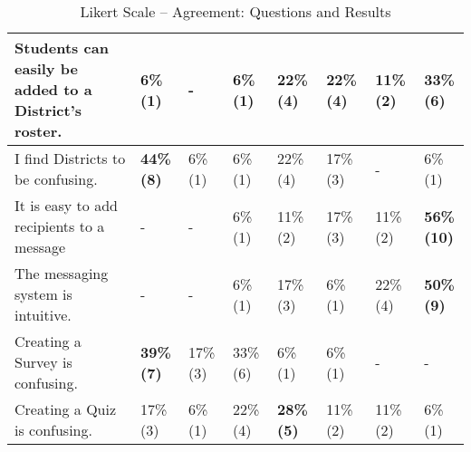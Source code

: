 \begin{table}[h!]
{\begin{tabular}{| C{8cm} |p{0.7cm}|p{0.7cm}|p{0.7cm}|p{0.7cm}|p{0.7cm}|p{0.7cm}|p{0.7cm}|}
\hline Students can easily be added to a District's roster.
	& 6\% \newline (1) & - & 6\% \newline (1) & 22\% \newline (4) & 22\% \newline (4) & 11\% \newline (2) & \textbf{33\% \newline (6)} \\
\hline I find Districts to be confusing.
	& \textbf{44\% \newline (8)} & 6\% \newline (1) & 6\% \newline (1) & 22\% \newline (4) & 17\% \newline (3) & - & 6\% \newline (1) \\
\hline It is easy to add recipients to a message
	& - & - & 6\% \newline (1) & 11\% \newline (2) & 17\% \newline (3) & 11\% \newline (2) & \textbf{56\% \newline (10)} \\
\hline The messaging system is intuitive.
	& - & - & 6\% \newline (1) & 17\% \newline (3) & 6\% \newline (1) & 22\% \newline (4) & \textbf{50\% \newline (9)} \\
\hline Creating a Survey is confusing.
	& \textbf{39\% \newline (7)} & 17\% \newline (3) & 33\% \newline (6) & 6\% \newline (1) & 6\% \newline (1) & - & - \\
\hline Creating a Quiz is confusing.
	& 17\% \newline (3) & 6\% \newline (1) & 22\% \newline (4) & \textbf{28\% \newline (5)} & 11\% \newline (2) & 11\% \newline (2) & 6\% \newline (1) \\
\hline
\end{tabular}
}
\caption{Likert Scale -- Agreement: Questions and Results}
\label{table:agreement}
\end{table}

